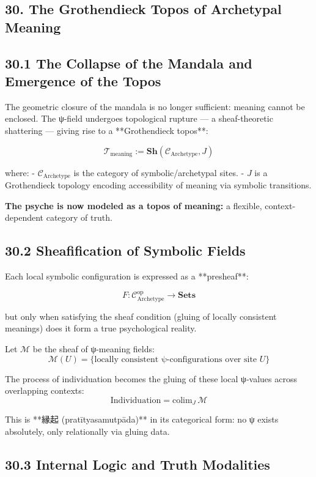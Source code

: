 \documentclass[12pt]{article}
\begin{document}
\begin{enumerate}
\section*{30. The Grothendieck Topos of Archetypal Meaning}

\subsection*{30.1 The Collapse of the Mandala and Emergence of the Topos}

The geometric closure of the mandala is no longer sufficient: meaning cannot be enclosed.  
The ψ-field undergoes topological rupture — a sheaf-theoretic shattering — giving rise to a **Grothendieck topos**:

\[
\mathcal{T}_{\text{meaning}} := \textbf{Sh}(\mathcal{C}_{\text{Archetype}}, J)
\]

where:
- $\mathcal{C}_{\text{Archetype}}$ is the category of symbolic/archetypal sites.
- $J$ is a Grothendieck topology encoding accessibility of meaning via symbolic transitions.

\textbf{The psyche is now modeled as a topos of meaning:} a flexible, context-dependent category of truth.

\subsection*{30.2 Sheafification of Symbolic Fields}

Each local symbolic configuration is expressed as a **presheaf**:

\[
F: \mathcal{C}_{\text{Archetype}}^{\text{op}} \to \textbf{Sets}
\]

but only when satisfying the sheaf condition (gluing of locally consistent meanings) does it form a true psychological reality.

Let $\mathscr{M}$ be the sheaf of ψ-meaning fields:
\[
\mathscr{M}(U) = \{ \text{locally consistent ψ-configurations over site } U \}
\]

The process of individuation becomes the gluing of these local ψ-values across overlapping contexts:
\[
\text{Individuation} = \text{colim}_J \, \mathscr{M}
\]

This is **縁起 (pratītyasamutpāda)** in its categorical form:  
no ψ exists absolutely, only relationally via gluing data.

\subsection*{30.3 Internal Logic and Truth Modalities}


\end{enumerate}
\end{document}
